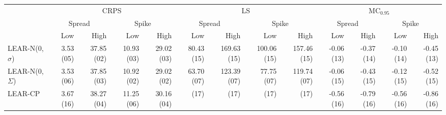 \begin{tabular}{lrrrrrrrrrrrr}
\toprule
 & \multicolumn{4}{c}{CRPS} & \multicolumn{4}{c}{LS} & \multicolumn{4}{c}{$\text{MC}_{0.95}$} \\
 & \multicolumn{2}{c}{Spread} & \multicolumn{2}{c}{Spike} & \multicolumn{2}{c}{Spread} & \multicolumn{2}{c}{Spike} & \multicolumn{2}{c}{Spread} & \multicolumn{2}{c}{Spike} \\
 & Low & High & Low & High & Low & High & Low & High & Low & High & Low & High \\
\midrule
LEAR-N(0, $\sigma$) & {\cellcolor[HTML]{DCD8D8}} \color[HTML]{000000} 3.53 (05) & {\cellcolor[HTML]{309494}} \color[HTML]{F1F1F1} 37.85 (02) & {\cellcolor[HTML]{399898}} \color[HTML]{F1F1F1} 10.93 (03) & {\cellcolor[HTML]{269090}} \color[HTML]{F1F1F1} 29.02 (03) & {\cellcolor[HTML]{CD5C5C}} \color[HTML]{F1F1F1} 80.43 (15) & {\cellcolor[HTML]{CD5C5C}} \color[HTML]{F1F1F1} 169.63 (15) & {\cellcolor[HTML]{CD5C5C}} \color[HTML]{F1F1F1} 100.06 (15) & {\cellcolor[HTML]{CD5C5C}} \color[HTML]{F1F1F1} 157.46 (15) & {\cellcolor[HTML]{8ABABA}} \color[HTML]{000000} -0.06 (13) & {\cellcolor[HTML]{D18282}} \color[HTML]{F1F1F1} -0.37 (14) & {\cellcolor[HTML]{D5A4A4}} \color[HTML]{000000} -0.10 (14) & {\cellcolor[HTML]{D6AAAA}} \color[HTML]{000000} -0.45 (13) \\
LEAR-N(0, $\Sigma$) & {\cellcolor[HTML]{DBD6D6}} \color[HTML]{000000} 3.53 (06) & {\cellcolor[HTML]{309494}} \color[HTML]{F1F1F1} 37.85 (03) & {\cellcolor[HTML]{379797}} \color[HTML]{F1F1F1} 10.92 (02) & {\cellcolor[HTML]{269090}} \color[HTML]{F1F1F1} 29.02 (02) & {\cellcolor[HTML]{A6C5C5}} \color[HTML]{000000} 63.70 (07) & {\cellcolor[HTML]{72B0B0}} \color[HTML]{F1F1F1} 123.39 (07) & {\cellcolor[HTML]{8ABABA}} \color[HTML]{000000} 77.75 (07) & {\cellcolor[HTML]{B5CCCC}} \color[HTML]{000000} 119.74 (07) & {\cellcolor[HTML]{96BFBF}} \color[HTML]{000000} -0.06 (15) & {\cellcolor[HTML]{D07979}} \color[HTML]{F1F1F1} -0.43 (15) & {\cellcolor[HTML]{D49B9B}} \color[HTML]{F1F1F1} -0.12 (15) & {\cellcolor[HTML]{D49999}} \color[HTML]{F1F1F1} -0.52 (15) \\
LEAR-CP & {\cellcolor[HTML]{CD5C5C}} \color[HTML]{F1F1F1} 3.67 (16) & {\cellcolor[HTML]{379797}} \color[HTML]{F1F1F1} 38.27 (04) & {\cellcolor[HTML]{5BA6A6}} \color[HTML]{F1F1F1} 11.25 (06) & {\cellcolor[HTML]{3C9999}} \color[HTML]{F1F1F1} 30.16 (04) & {\cellcolor[HTML]{FFFFFF}} \color[HTML]{000000}  (17) & {\cellcolor[HTML]{FFFFFF}} \color[HTML]{000000}  (17) & {\cellcolor[HTML]{FFFFFF}} \color[HTML]{000000}  (17) & {\cellcolor[HTML]{FFFFFF}} \color[HTML]{000000}  (17) & {\cellcolor[HTML]{CD5C5C}} \color[HTML]{F1F1F1} -0.56 (16) & {\cellcolor[HTML]{CD5C5C}} \color[HTML]{F1F1F1} -0.79 (16) & {\cellcolor[HTML]{CD5C5C}} \color[HTML]{F1F1F1} -0.56 (16) & {\cellcolor[HTML]{CD5C5C}} \color[HTML]{F1F1F1} -0.86 (16) \\

\end{tabular}
